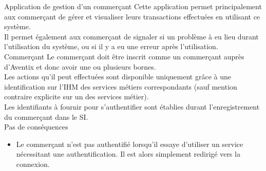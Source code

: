 \CUBref
{Application de gestion d'un commerçant}
{
  Cette application permet principalement aux commerçant de gérer et visualiser
  leurs transactions effectuées en utilisant ce système. \\

  Il permet également aux commerçant de signaler si un problème à eu lieu
  durant l'utilisation du système, ou si il y a eu une erreur après
  l'utilisation. \\
}
{Commerçant}
{
  Le commerçant doit être inscrit comme un commerçant auprès d'Aventix et donc
  avoir une ou plusieurs bornes. \\

  Les actions qu'il peut effectuées sont disponible uniquement grâce à une
  identification sur l'IHM des services métiers correspondants (sauf mention
  contraire explicite sur un des services métier). \\

  Les identifiants à fournir pour s'authentifier sont établies durant
  l'enregistrement du commerçant dans le SI. \\
}
{Pas de conséquences}
{
  \begin{itemize}
    \item Le commerçant n'est pas authentifié lorsqu'il essaye d'utiliser un
      service nécessitant une authentification. Il est alors simplement redirigé
      vers la connexion.
  \end{itemize}
}


